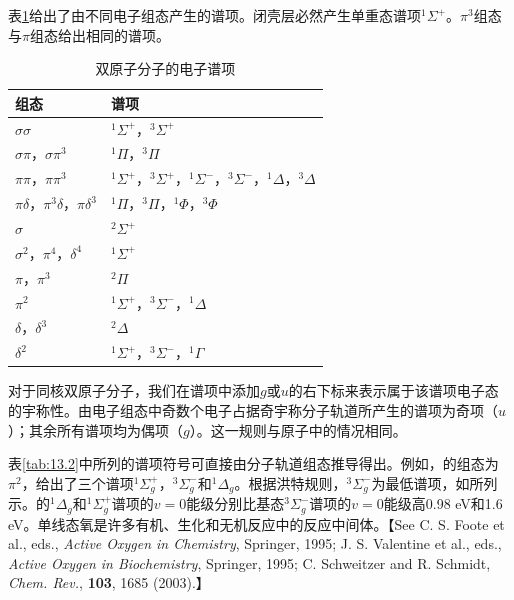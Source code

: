     表\ref{tab:13.3}给出了由不同电子组态产生的谱项。闭壳层必然产生单重态谱项$^1\Sigma^+$。$\pi^3$组态与$\pi$组态给出相同的谱项。
    \begin{table}[htbp]
        \centering
        \renewcommand{\arraystretch}{1.2}
        \begin{tabular}{|l|l|}
            \hline
            组态 & 谱项 \\
            \hline
            $\sigma\sigma$ & $^1\Sigma^+$，$^3\Sigma^+$ \\
            \hline
            $\sigma\pi$，$\sigma\pi^3$ & $^1\Pi$，$^3\Pi$ \\
            \hline
            $\pi\pi$，$\pi\pi^3$ & $^{1}\Sigma^{+}$，$^{3}\Sigma^{+}$，$^{1}\Sigma^{-}$，$^{3}\Sigma^{-}$，$^{1}\Delta$，$^{3}\Delta$ \\
            \hline
            $\pi\delta$，$\pi^3\delta$，$\pi\delta^3$ & ${}^{1}\Pi$，${}^{3}\Pi$，${}^{1}\Phi$，${}^{3}\Phi$ \\
            \hline
            $\sigma$ & $^2\Sigma^+$ \\
            \hline
            $\sigma^2$，$\pi^4$，$\delta^4$ & $^1\Sigma^+$ \\
            \hline
            $\pi$，$\pi^3$ & $^2\Pi$ \\
            \hline
            $\pi^2$ & $^1\Sigma^+$，$^3\Sigma^-$，$^1\Delta$ \\
            \hline
            $\delta$，$\delta^3$ & $^2\Delta$ \\
            \hline
            $\delta^2$ & $^1\Sigma^+$，$^3\Sigma^-$，$^1\Gamma$ \\
            \hline
        \end{tabular}
        \caption{双原子分子的电子谱项}
        \label{tab:13.3}
    \end{table}

    对于同核双原子分子，我们在谱项中添加$g$或$u$的右下标来表示属于该谱项电子态的宇称性。由电子组态中奇数个电子占据奇宇称分子轨道所产生的谱项为奇项（$u$）；其余所有谱项均为偶项（$g$）。这一规则与原子中的情况相同。

    表\ref{tab:13.2}中所列的谱项符号可直接由分子轨道组态推导得出。例如，的组态为$\pi^2$，给出了三个谱项$^1\Sigma^+_g$，$^3\Sigma^-_g$和$^1\Delta_g$。根据洪特规则，$^3\Sigma^-_g$为最低谱项，如所列示。的$^1\Delta_g$和$^1\Sigma^+_g$谱项的$v=0$能级分别比基态$^3\Sigma^-_g$谱项的$v=0$能级高0.98 eV和1.6 eV。单线态氧是许多有机、生化和无机反应中的反应中间体。【See C. S. Foote et al., eds., \textit{Active Oxygen in Chemistry}, Springer, 1995; J. S. Valentine et al., eds., \textit{Active Oxygen in Biochemistry}, Springer, 1995; C. Schweitzer and R. Schmidt, \textit{Chem. Rev.}, \textbf{103}, 1685 (2003).】

